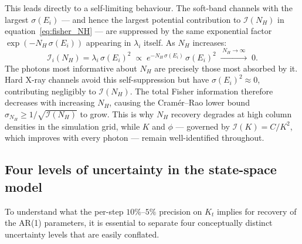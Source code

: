 \documentclass[11pt, a4paper]{article}
\begin{document}
This leads directly to a self-limiting behaviour. The soft-band channels with the
largest $\sigma(E_i)$ --- and hence the largest potential contribution to
$\mathcal{I}(N_H)$ in equation~\eqref{eq:fisher_NH} --- are suppressed by the same
exponential factor $\exp(-N_H\,\sigma(E_i))$ appearing in $\lambda_i$ itself.
As $N_H$ increases:
\begin{equation}
    \mathcal{I}_i(N_H) = \lambda_i\,\sigma(E_i)^2
    \;\propto\; e^{-N_H\,\sigma(E_i)}\,\sigma(E_i)^2
    \;\xrightarrow{\;N_H\to\infty\;}\; 0.
\end{equation}
The photons most informative about $N_H$ are precisely those most absorbed by it.
Hard X-ray channels avoid this self-suppression but have $\sigma(E_i)^2 \approx 0$,
contributing negligibly to $\mathcal{I}(N_H)$.
The total Fisher information therefore decreases with increasing $N_H$, causing the
Cram\'er--Rao lower bound $\sigma_{N_H} \geq 1/\sqrt{\mathcal{I}(N_H)}$ to grow.
This is why $N_H$ recovery degrades at high column densities in the simulation grid,
while $K$ and $\phi$ --- governed by $\mathcal{I}(K) = C/K^2$, which improves with
every photon --- remain well-identified throughout.


\subsection*{Four levels of uncertainty in the state-space model}

To understand what the per-step $10\%$--$5\%$ precision on $K_t$ implies for recovery
of the AR(1) parameters, it is essential to separate four conceptually distinct
uncertainty levels that are easily conflated.
\end{document}
